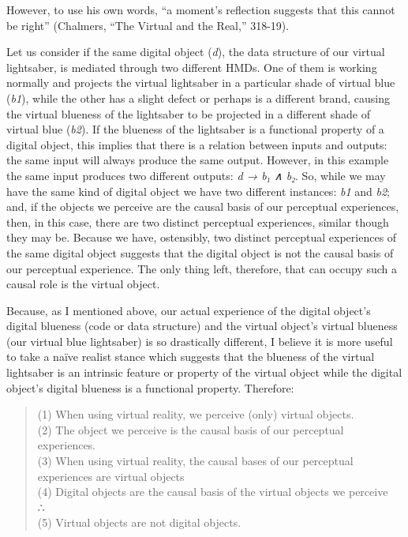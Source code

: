 \documentclass{article}
\begin{document}
However, to use his own words, “a moment's reflection suggests that this cannot be right” (Chalmers, “The Virtual and the Real,” 318-19).

Let us consider if the same digital object (\textit{d}), the data structure of our virtual lightsaber, is mediated through two different HMDs. One of them is working normally and projects the virtual lightsaber in a particular shade of virtual blue (\textit{b1}), while the other has a slight defect or perhaps is a different brand, causing the virtual blueness of the lightsaber to be projected in a different shade of virtual blue (\textit{b2}). If the blueness of the lightsaber is a functional property of a digital object, this implies that there is a relation between inputs and outputs: the same input will always produce the same output. However, in this example the same input produces two different outputs: \textit{d → b₁ ∧ b₂}. So, while we may have the same kind of digital object we have two different instances: \textit{b1} and \textit{b2}; and, if the objects we perceive are the causal basis of our perceptual experiences, then, in this case, there are two distinct perceptual experiences, similar though they may be. Because we have, ostensibly, two distinct perceptual experiences of the same digital object suggests that the digital object is not the causal basis of our perceptual experience. The only thing left, therefore, that can occupy such a causal role is the virtual object.

Because, as I mentioned above, our actual experience of the digital object’s digital blueness (code or data structure) and the virtual object’s virtual blueness (our virtual blue lightsaber) is so drastically different, I believe it is more useful to take a naïve realist stance which suggests that the blueness of the virtual lightsaber is an intrinsic feature or property of the virtual object while the digital object’s digital blueness is a functional property. Therefore:

\begin{quote}
(1) When using virtual reality, we perceive (only) virtual objects. \\
(2) The object we perceive is the causal basis of our perceptual experiences. \\
(3) When using virtual reality, the causal bases of our perceptual experiences are virtual objects \\
(4) Digital objects are the causal basis of the virtual objects we perceive \\
∴ \\
(5) Virtual objects are not digital objects.
\end{quote}
\end{document}
